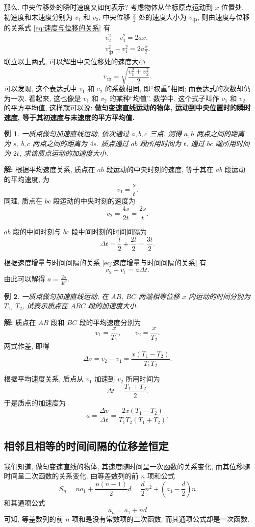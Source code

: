 \documentclass[UTF8,openany,fontset=fandol]{ctexbook}
\theoremstyle{chinesetextbook}
\newtheorem{example}{例}[chapter]
\newenvironment{solution}{\par\indent\textbf{解:} \ignorespaces}{\par}
\begin{document}
那么, 中央位移处的瞬时速度又如何表示? 考虑物体从坐标原点运动到 $x$ 位置处, 初速度和末速度分别为 $v_1$ 和 $v_2$, 中央位移 $\displaystyle\frac{x}{2}$ 处的速度大小为 $v_\text{中}$, 则由速度与位移的关系式 \eqref{eq:速度与位移的关系} 有
\[
\begin{gathered}
v_2^2-v_1^2=2ax,\\
v_\text{中}^2-v_1^2=2a\frac{x}{2}.
\end{gathered}
\]
联立以上两式, 可以解出中央位移处的速度大小
\[
v_\text{中}=\sqrt{\frac{v_1^2+v_2^2}{2}}.
\]
可以发现, 这个表达式中 $v_1$ 和 $v_2$ 的系数相同, 即“权重”相同; 而表达式的次数却仍为一次. 看起来, 这也像是 $v_1$ 和 $v_2$ 的某种“均值”. 数学中, 这个式子叫作 $v_1$ 和 $v_2$ 的平方平均值, 这样就可以说: \textbf{做匀变速直线运动的物体, 运动到中央位置时的瞬时速度, 等于其初速度与末速度的平方平均值.}
\begin{example}
一质点做匀加速直线运动, 依次通过 $a,b,c$ 三点. 测得 $a,b$ 两点之间的距离为 $s$, $b,c$ 两点之间的距离为 $4s$. 质点通过 $ab$ 段所用时间为 $t$, 通过 $bc$ 端所用时间为 $2t$, 求该质点运动的加速度大小.
\end{example}
\begin{solution}
根据平均速度关系, 质点在 $ab$ 段运动的中央时刻的速度, 等于其在 $ab$ 段运动的平均速度, 为
\[
v_1=\frac{s}{t}.
\]
同理, 质点在 $bc$ 段运动的中央时刻的速度为
\[
v_2=\frac{4s}{2t}=\frac{2s}{t}.
\]

$ab$ 段的中间时刻与 $bc$ 段中间时刻的时间间隔为
\[
\Delta t=\frac{t}{2}+\frac{2t}{2}=\frac{3t}{2}.
\]

根据速度增量与时间间隔的关系 \eqref{eq:速度增量与时间间隔的关系} 有
\[
v_2-v_1=a\Delta t.
\]
由此可以解得 $\displaystyle a=\frac{2s}{3t^2}.$
\end{solution}
\begin{example}
一质点做匀加速直线运动, 在 $AB$, $BC$ 两端相等位移 $x$ 内运动的时间分别为 $T_1$, $T_2$, 试表示质点在 $ABC$ 段的加速度大小.
\end{example}
\begin{solution}
质点在 $AB$ 段和 $BC$ 段的平均速度分别为
\[
v_1=\frac{x}{T_1},\qquad v_2=\frac{x}{T_2}.
\]
两式作差, 即得
\[
\Delta v=v_2-v_1=\frac{x(T_1-T_2)}{T_1T_2}.
\]

根据平均速度关系, 质点从 $v_1$ 加速到 $v_2$ 所用时间为
\[
\Delta t=\frac{T_1+T_2}{2}.
\]
于是质点的加速度为
\[
a=\frac{\Delta v}{\Delta t}=\frac{2x(T_1-T_2)}{T_1T_2(T_1+T_2)}.
\]
\end{solution}
\subsection{相邻且相等的时间间隔的位移差恒定}
我们知道, 做匀变速直线的物体, 其速度随时间呈一次函数的关系变化, 而其位移随时间呈二次函数的关系变化. 由等差数列的前 $n$ 项和公式
\[
S_n=na_1+\frac{n(n-1)}{2}d=\frac{d}{2}n^2+\left(a_1-\frac{d}{2}\right)n
\]
和其通项公式
\[
a_n=a_1+nd
\]
可知, 等差数列的前 $n$ 项和是没有常数项的二次函数, 而其通项公式却是一次函数.
\end{document}
